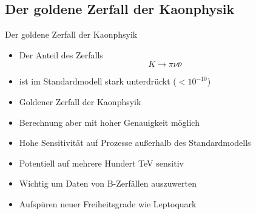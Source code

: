 \documentclass[aspectratio=1610, professionalfonts, 9pt, t]{beamer}
\begin{document}
  \subsection{Der goldene Zerfall der Kaonphysik}

  \begin{frame}{Der goldene Zerfall der Kaonphsyik}
    \begin{itemize}
      \item Der Anteil des Zerfalls
      \begin{equation*}
        K \rightarrow \pi \nu \bar{\nu}
      \end{equation*}
      \item[] ist im Standardmodell stark unterdrückt ($<10^{-10}$)
      \item[\rightarrow] Goldener Zerfall der Kaonphsyik
      \item Berechnung aber mit hoher Genauigkeit möglich
      \item[\rightarrow] Hohe Sensitivität auf Prozesse außerhalb des Standardmodells
      \item[\rightarrow] Potentiell auf mehrere Hundert TeV sensitiv
      \item Wichtig um Daten von B-Zerfällen auszuwerten
      \item[\rightarrow] Aufspüren neuer Freiheitsgrade wie Leptoquark
    \end{itemize}
  \end{frame}
\end{document}

